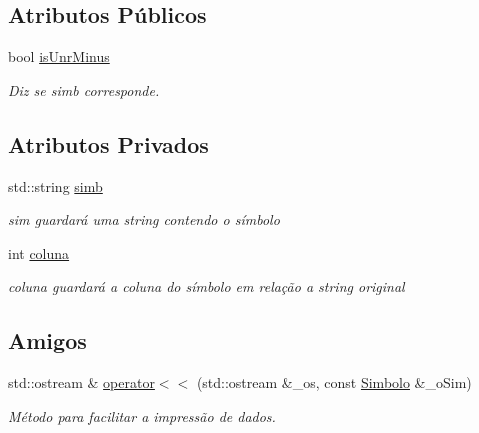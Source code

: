 \subsection*{Atributos Públicos}
\begin{DoxyCompactItemize}
\item 
\hypertarget{class_simbolo_ad4e2e190d1f4e337db6feba02e047afd}{bool \hyperlink{class_simbolo_ad4e2e190d1f4e337db6feba02e047afd}{is\-Unr\-Minus}}\label{class_simbolo_ad4e2e190d1f4e337db6feba02e047afd}

\begin{DoxyCompactList}\small\item\em Diz se simb corresponde. \end{DoxyCompactList}\end{DoxyCompactItemize}
\subsection*{Atributos Privados}
\begin{DoxyCompactItemize}
\item 
\hypertarget{class_simbolo_a2114c92c128d535912bab50b9406d30e}{std\-::string \hyperlink{class_simbolo_a2114c92c128d535912bab50b9406d30e}{simb}}\label{class_simbolo_a2114c92c128d535912bab50b9406d30e}

\begin{DoxyCompactList}\small\item\em sim guardará uma string contendo o símbolo \end{DoxyCompactList}\item 
\hypertarget{class_simbolo_aa23f21b84a1e1f451d404e6df1aaff1b}{int \hyperlink{class_simbolo_aa23f21b84a1e1f451d404e6df1aaff1b}{coluna}}\label{class_simbolo_aa23f21b84a1e1f451d404e6df1aaff1b}

\begin{DoxyCompactList}\small\item\em coluna guardará a coluna do símbolo em relação a string original \end{DoxyCompactList}\end{DoxyCompactItemize}
\subsection*{Amigos}
\begin{DoxyCompactItemize}
\item 
std\-::ostream \& \hyperlink{class_simbolo_aa8599b912a228132e004a92ec85a2fce}{operator$<$$<$} (std\-::ostream \&\-\_\-os, const \hyperlink{class_simbolo}{Simbolo} \&\-\_\-o\-Sim)
\begin{DoxyCompactList}\small\item\em Método para facilitar a impressão de dados. \end{DoxyCompactList}\end{DoxyCompactItemize}


